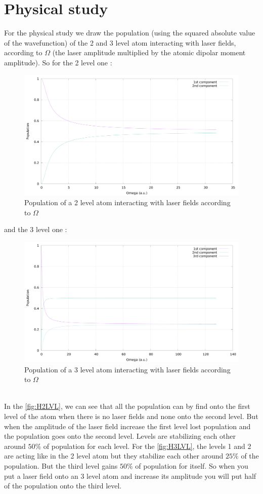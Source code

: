 \documentclass[1pt, a4paper]{article}
\begin{document}
\section{Physical study}
\label{sec:study}
\noindent
For the physical study we draw the population (using the squared absolute value of the wavefunction) of the 2 and 3 level atom interacting with laser fields, according to $\Omega$ (the laser amplitude multiplied by the atomic dipolar moment amplitude). So for the 2 level one :
\begin{figure}[htbp]
    \centering
    \includegraphics[width=.70\linewidth]{wavefunction_H2.pdf}
    \caption{Population of a 2 level atom interacting with laser fields according to $\Omega$}
    \label{fig:H2LVL}
\end{figure}
\newpage
and the 3 level one :
\begin{figure}[htbp]
    \centering
    \includegraphics[width=.70\linewidth]{wavefunction_H3.pdf}
    \caption{Population of a 3 level atom interacting with laser fields according to $\Omega$}
    \label{fig:H3LVL}
\end{figure}\\
In the \autoref{fig:H2LVL}, we can see that all the population can by find onto the first level of the atom when there is no laser fields and none onto the second level. But when the amplitude of the laser field increase the first level lost population and the population goes onto the second level. Levels are stabilizing each other around $50\%$ of population for each level. For the \autoref{fig:H3LVL}, the levels 1 and 2 are acting like in the 2 level atom but they stabilize each other around $25\%$ of the population. But the third level gains $50\%$ of population for itself. So when you put a laser field onto an 3 level atom and increase its amplitude you will put half of the population onto the third level.\\
\end{document}
